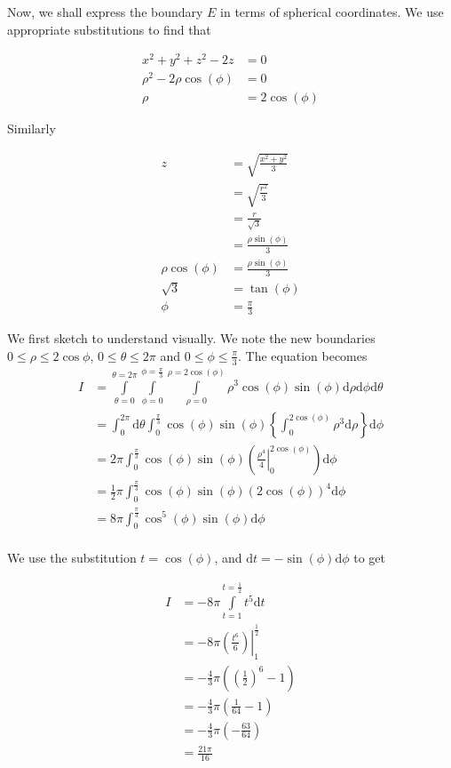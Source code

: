 \documentclass[11pt]{article}
\theoremstyle{plain} %
\theoremstyle{definition}
\theoremstyle{example}
\theoremstyle{remark}
\begin{document}
Now, we shall express the boundary $E$ in terms of spherical coordinates. We use appropriate substitutions to find that 

\begin{align*}
x^2+y^2+z^2-2z&=0\\
\rho^2-2\rho\cos(\phi)&=0\\
\rho &= 2 \cos(\phi)
\end{align*}

Similarly

\begin{align*}
z &= \sqrt{\frac{x^2+y^2}{3}}\\
&= \sqrt{\frac{r^2}{3}}\\
&= \frac{r}{\sqrt{3}}\\
&= \frac{\rho\sin(\phi)}{3}\\
\rho\cos(\phi)&= \frac{\rho\sin(\phi)}{3}\\
\sqrt{3}&= \tan(\phi)\\
\phi &= \frac{\pi}{3}
\end{align*}

We first sketch to understand visually. We note the new boundaries $0 \leq \rho \leq 2 \cos\phi$, $0 \leq \theta \leq 2\pi$ and $0 \leq \phi \leq \frac{\pi}{3}$. The equation becomes 
\begin{align*}
	I &= \int \limits_{\theta = 0}^{\theta = 2 \pi} \int \limits_{\phi = 0}^{\phi = \frac{\pi}{3}} \int \limits_{\rho = 0}^{\rho = 2 \cos(\phi)} \rho^3 \cos(\phi)\sin(\phi) \mathrm d \rho \mathrm d \phi \mathrm d \theta \\
	&= \int_0^{2\pi} \mathrm d \theta \int_0^{\frac{\pi}{3}}\cos(\phi)\sin(\phi)  \left\{\int_0^{2\cos(\phi)}\rho^3\mathrm d \rho\right\}\mathrm d \phi\\
	&= 2\pi \int_0^{\frac{\pi}{3}}\cos(\phi)\sin(\phi) \left(\left.\frac{\rho^4}{4}\right|_0^{2\cos(\phi)}\right)\mathrm d \phi\\
	&= \frac{1}{2}\pi \int_0^{\frac{\pi}{3}}\cos(\phi)\sin(\phi) (2\cos(\phi))^4\mathrm d \phi\\
	&= 8\pi \int_0^{\frac{\pi}{3}}\cos^5(\phi)\sin(\phi) \mathrm d \phi\\
\end{align*}

We use the substitution $t= \cos(\phi)$, and $\mathrm d t = -\sin(\phi)\mathrm d \phi$ to get

\begin{align*}
	I &= -8 \pi \int \limits_{t=1}^{t = \frac{1}{2}} t^5 \mathrm d t\\
	&= -8 \pi \left.\left(\frac{t^6}{6}\right)\right|_1^{\frac{1}{2}}\\
	&= -\frac{4}{3} \pi\left(\left(\frac{1}{2}\right)^6-1\right)\\
	&= -\frac{4}{3} \pi\left(\frac{1}{64}-1\right)\\
	&= -\frac{4}{3} \pi\left(-\frac{63}{64}\right)\\
	&= \frac{21\pi}{16}
\end{align*}
\end{document}
